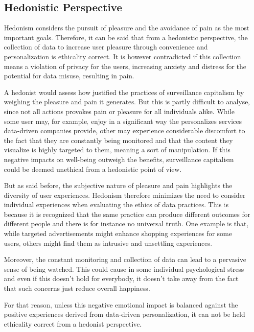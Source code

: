 \subsection{Hedonistic Perspective}\label{subsec:hedonistic-perspective}
Hedonism considers the pursuit of pleasure and the avoidance of pain as the most important goals\cite{Crisp2006_HedonismReconsidered}.
Therefore, it can be said that from a hedonistic perspective, the collection of data to increase user pleasure through convenience and personalization is ethicality correct.
It is however contradicted if this collection means a violation of privacy for the users, increasing anxiety and distress for the potential for data misuse, resulting in pain.

A hedonist would assess how justified the practices of surveillance capitalism by weighing the pleasure and pain it generates.
But this is partly difficult to analyse, since not all actions provokes pain or pleasure for all individuals alike.
While some user may, for example, enjoy in a significant way the personalizes services data-driven companies provide, other may experience considerable discomfort to the fact that they are constantly being monitored and that the content they visualize is highly targeted to them, meaning a sort of manipulation.
If this negative impacts on well-being outweigh the benefits, surveillance capitalism could be deemed unethical from a hedonistic point of view.

But as said before, the subjective nature of pleasure and pain highlights the diversity of user experiences.
Hedonism therefore minimizes the need to consider individual experiences when evaluating the ethics of data practices.
This is because it is recognized that the same practice can produce different outcomes for different people and there is for instance no universal truth.
One example is that, while targeted advertisements might enhance shopping experiences for some users, others might find them as intrusive and unsettling experiences.

Moreover, the constant monitoring and collection of data can lead to a pervasive sense of being watched.
This could cause in some individual psychological stress and even if this doesn't hold for everybody, it doesn't take away from the fact that such concerns just reduce overall happiness.

For that reason, unless this negative emotional impact is balanced against the positive experiences derived from data-driven personalization, it can not be held ethicality correct from a hedonist perspective.